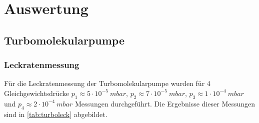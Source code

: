 \section{Auswertung}
\label{sec:Auswertung}

\subsection{Turbomolekularpumpe}
\label{subsec:Turbomolekularpumpe}

\subsubsection{Leckratenmessung}

Für die Leckratenmessung der Turbomolekularpumpe wurden für 4 Gleichgewichtsdrücke $p_1 \approx 5 \cdot 10^{-5} \: \si{mbar}$, $p_2 \approx 7 \cdot 10^{-5} \: \si{mbar}$,
$p_3 \approx 1 \cdot 10^{-4} \: \si{mbar}$ und $p_4 \approx 2 \cdot 10^{-4} \: \si{mbar}$ Messungen durchgeführt. Die Ergebnisse dieser Messungen sind in \autoref{tab:turboleck}
abgebildet.

